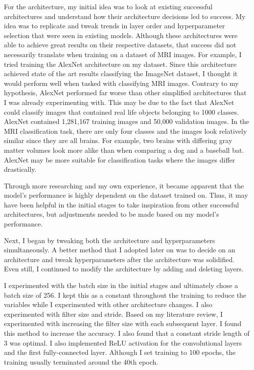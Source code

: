 \documentclass[10pt,twocolumn]{article}
\begin{document}
For the architecture, my initial idea was to look at existing successful architectures and understand how their architecture decisions led to success. My idea was to replicate and tweak trends in layer order and hyperparameter selection that were seen in existing models. Although these architectures were able to achieve great results on their respective datasets, that success did not necessarily translate when training on a dataset of MRI images. For example, I tried training the AlexNet architecture on my dataset. Since this architecture achieved state of the art results classifying the ImageNet dataset, I thought it would perform well when tasked with classifying MRI images. Contrary to my hypothesis, AlexNet performed far worse than other simplified architectures that I was already experimenting with. This may be due to the fact that AlexNet could classify images that contained real life objects belonging to 1000 classes. AlexNet contained 1,281,167 training images and 50,000 validation images. In the MRI classification task, there are only four classes and the images look relatively similar since they are all brains. For example, two brains with differing gray matter volumes look more alike than when comparing a dog and a baseball bat. AlexNet may be more suitable for classification tasks where the images differ drastically. 

Through more researching and my own experience, it became apparent that the model’s performance is highly dependent on the dataset trained on. Thus, it may have been helpful in the initial stages to take inspiration from other successful architectures, but adjustments needed to be made based on my model’s performance. 

Next, I began by tweaking both the architecture and hyperparameters simultaneously. A better method that I adopted later on was to decide on an architecture and tweak hyperparameters after the architecture was solidified. Even still, I continued to modify the architecture by adding and deleting layers. 

I experimented with the batch size in the initial stages and ultimately chose a batch size of 256. I kept this as a constant throughout the training to reduce the variables while I experimented with other architecture changes. I also experimented with filter size and stride. Based on my literature review, I experimented with increasing the filter size with each subsequent layer. I found this method to increase the accuracy. I also found that a constant stride length of 3 was optimal. I also implemented ReLU activation for the convolutional layers and the first fully-connected layer. Although I set training to 100 epochs, the training usually terminated around the 40th epoch.
\end{document}

